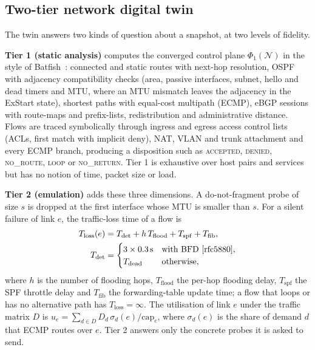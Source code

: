 \documentclass[pdflatex,iicol,sn-mathphys-num]{sn-jnl}%
\theoremstyle{thmstyletwo}%
\begin{document}
\subsection{Two-tier network digital twin}\label{sec:twin}

The twin answers two kinds of question about a snapshot, at two levels of fidelity.

\textbf{Tier 1 (static analysis)} computes the converged control plane $\Phi_1(\mathcal{N})$ in the style of Batfish~\cite{fogel2015batfish}: connected and static routes with next-hop resolution, OSPF~\cite{rfc2328} with adjacency compatibility checks (area, passive interfaces, subnet, hello and dead timers and MTU, where an MTU mismatch leaves the adjacency in the ExStart state), shortest paths with equal-cost multipath (ECMP), eBGP sessions with route-maps and prefix-lists, redistribution and administrative distance. Flows are traced symbolically through ingress and egress access control lists (ACLs, first match with implicit deny), NAT, VLAN and trunk attachment and every ECMP branch, producing a disposition such as \textsc{accepted}, \textsc{denied}, \textsc{no\_route}, \textsc{loop} or \textsc{no\_return}. Tier 1 is exhaustive over host pairs and services but has no notion of time, packet size or load.

\textbf{Tier 2 (emulation)} adds these three dimensions. A do-not-fragment probe of size $s$ is dropped at the first interface whose MTU is smaller than $s$. For a silent failure of link $e$, the traffic-loss time of a flow is
\begin{equation}
\begin{split}
T_{\mathrm{loss}}(e) &= T_{\mathrm{det}} + h\,T_{\mathrm{flood}} + T_{\mathrm{spf}} + T_{\mathrm{fib}},\\
T_{\mathrm{det}}&=\begin{cases}3\times 0.3\,\mathrm{s} & \text{with BFD~\cite{rfc5880}},\\ T_{\mathrm{dead}} & \text{otherwise},\end{cases}
\end{split}\label{eq:conv}
\end{equation}
where $h$ is the number of flooding hops, $T_{\mathrm{flood}}$ the per-hop flooding delay, $T_{\mathrm{spf}}$ the SPF throttle delay and $T_{\mathrm{fib}}$ the forwarding-table update time; a flow that loops or has no alternative path has $T_{\mathrm{loss}}=\infty$. The utilisation of link $e$ under the traffic matrix $D$ is $u_e=\sum_{d\in D} D_d\,\sigma_d(e)/\mathrm{cap}_e$, where $\sigma_d(e)$ is the share of demand $d$ that ECMP routes over $e$. Tier 2 answers only the concrete probes it is asked to send.
\end{document}

